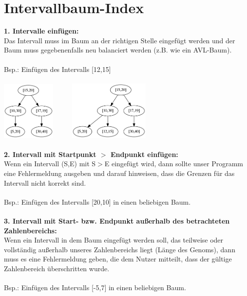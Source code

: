 \documentclass[a4paper,12pt]{scrartcl}
\begin{document}
\section{Intervallbaum-Index}
\textbf{1. Intervalle einfügen:}\\
Das Intervall muss im Baum an der richtigen Stelle eingefügt werden und der Baum muss gegebenenfalls neu balanciert werden (z.B. wie ein AVL-Baum).\\\\
Bsp.: Einfügen des Intervalls [12,15]\\\\
\includegraphics[width=0.2\textwidth]{Testfaelle/1.png}$~~~~~~~~~~~$
\includegraphics[width=0.3\textwidth]{Testfaelle/2.png}\\\\
\textbf{2. Intervall mit Startpunkt $>$ Endpunkt einfügen:}\\
Wenn ein Intervall (S,E) mit S$>$E eingefügt wird, dann sollte unser Programm eine Fehlermeldung ausgeben und darauf hinweisen, dass die Grenzen für das Intervall nicht korrekt sind.\\\\
Bsp.: Einfügen des Intervalls [20,10] in einen beliebigen Baum.\\\\
\textbf{3. Intervall mit Start- bzw. Endpunkt außerhalb des betrachteten Zahlenbereichs:}\\
Wenn ein Intervall in dem Baum eingefügt werden soll, das teilweise oder vollständig außerhalb unseres Zahlenbereichs liegt (Länge des Genoms), dann muss es eine Fehlermeldung geben, die dem Nutzer mitteilt, dass der gültige Zahlenbereich überschritten wurde.\\\\
Bsp.: Einfügen des Intervalls [-5,7] in einen beliebigen Baum.\\\\
\end{document}
